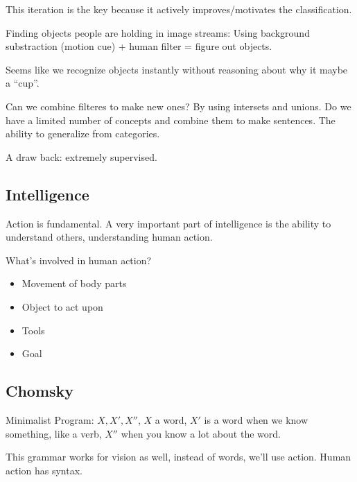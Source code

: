 This iteration is the key because it actively improves/motivates the
classification.

Finding objects people are holding in image streams: Using background
substraction (motion cue) + human filter = figure out objects.

Seems like we recognize objects instantly without reasoning about why
it maybe a ``cup''.

Can we combine filteres to make new ones? By using intersets and
unions. Do we have a limited number of concepts and combine them to
make sentences. The ability to generalize from categories.

A draw back: extremely supervised.

\subsection{Intelligence}
Action is fundamental. A very important part of intelligence is the
ability to understand others, understanding human action.

What's involved in human action? 
\begin{itemize}
\item Movement of body parts
\item Object to act upon
\item Tools
\item Goal
\end{itemize}

\subsection{Chomsky}
\label{sec:chomsky}
Minimalist Program: $X, X', X''$, $X$ a word, $X'$ is a word when we
know something, like a verb, $X''$ when you know a lot about the
word. 

This grammar works for vision as well, instead of words, we'll use
action. Human action has syntax.











 
